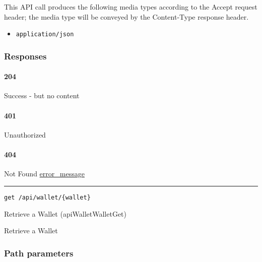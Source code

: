 This API call produces the following media types according to the
{Accept} request header; the media type will be conveyed by the
{Content-Type} response header.

\begin{itemize}
\tightlist
\item
  \texttt{application/json}
\end{itemize}

\hypertarget{responses-138}{%
\subsubsection{Responses}\label{responses-138}}

\hypertarget{section-449}{%
\paragraph{204}\label{section-449}}

Success - but no content \protect\hyperlink{}{}

\hypertarget{section-450}{%
\paragraph{401}\label{section-450}}

Unauthorized \protect\hyperlink{}{}

\hypertarget{section-451}{%
\paragraph{404}\label{section-451}}

Not Found \protect\hyperlink{error_message}{error\_message}

\begin{center}\rule{0.5\linewidth}{\linethickness}\end{center}

\protect\hypertarget{apiWalletWalletGet}{}{}

\begin{verbatim}
get /api/wallet/{wallet}
\end{verbatim}

Retrieve a Wallet ({apiWalletWalletGet})

Retrieve a Wallet

\hypertarget{path-parameters-75}{%
\subsubsection{Path parameters}\label{path-parameters-75}}

